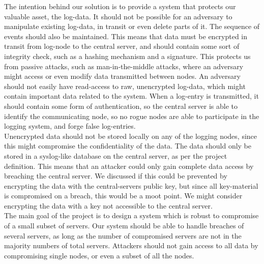The intention behind our solution is to provide a system that protects our valuable asset, the log-data. It should not be possible for an adversary to manipulate existing log-data, in transit or even delete parts of it. The sequence of events should also be maintained. This means that data must be encrypted in transit from log-node to the central server, and should contain some sort of integrity check, such as a hashing mechanism and a signature. This protects us from passive attacks, such as man-in-the-middle attacks, where an adversary might access or even modify data transmitted between nodes.
An adversary should not easily have read-access to raw, unencrypted log-data, which might contain important data related to the system. When a log-entry is transmitted, it should contain some form of authentication, so the central server is able to identify the communicating node, so no rogue nodes are able to participate in the logging system, and forge false log-entries.
\\Unencrypted data should not be stored locally on any of the logging nodes, since this might compromise the confidentiality of the data. The data should only be stored in a syslog-like database on the central server, as per the project definition. This means that an attacker could  only gain complete data access by breaching the central server. We discussed if this could be prevented by encrypting the data with the central-servers public key, but since all key-material is compromised on a breach, this would be a moot point. We might consider encrypting the data with a key not accessible to the central server.
\\The main goal of the project is to design a system which is robust to compromise of a small subset of servers. Our system should be able to handle breaches of several servers, as long as the number of compromised servers are not in the majority numbers of total servers.
Attackers should not gain access to all data by compromising single nodes, or even a subset of all the nodes.

